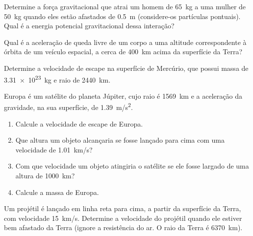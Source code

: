 \documentclass[a4paper]{article}
\begin{document}
 
\begin{exercicio}%
  \begin{inlineenum}%
  \inlineitem Determine a força gravitacional que atrai um homem de \SI{65}{kg} a uma mulher de \SI{50}{kg} quando eles estão afastados de \SI{0.5}{m} (considere-os partículas pontuais).
  \inlineitem Qual é a energia potencial gravitacional dessa interação? 
  \end{inlineenum}
\end{exercicio}

\begin{exercicio*}
  Qual é a aceleração de queda livre de um corpo a uma altitude correspondente à órbita de um veículo espacial, a cerca de \SI{400}{km} acima da superfície da Terra?
\end{exercicio*}

\begin{exercicio}
 Determine a velocidade de escape na superfície de Mercúrio, que possui massa de \SI{3.31e23}{kg} e raio de \SI{2440}{km}.
\end{exercicio}

\begin{exercicio}
 Europa é um satélite do planeta Júpiter, cujo raio é \SI{1569}{km} e a aceleração da gravidade, na sua superfície, de \SI{1.39}{m/s^2}.
\begin{enumerate}
\item Calcule a velocidade de escape de Europa.
\item Que altura um objeto alcançaria se fosse lançado para cima com uma velocidade de \SI{1.01}{km/s}?
\item Com que velocidade um objeto atingiria o satélite se ele fosse largado de uma altura de \SI{1000}{km}?
\item Calcule a massa de Europa.
\end{enumerate}
\end{exercicio}

\begin{exercicio}
 Um projétil é lançado em linha reta para cima, a partir da superfície da Terra, com velocidade \SI{15}{km/s}.
Determine a velocidade do projétil quando ele estiver bem afastado da Terra (ignore a resistência do ar. O raio da Terra é \SI{6370}{km}).
\end{exercicio}
\end{document}
